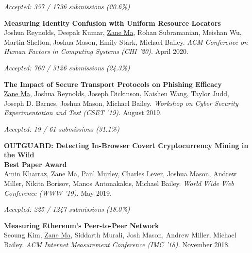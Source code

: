 \documentclass[10pt,singlecolumn]{article} %
\begin{document}
{\raggedleft\textit{Accepted: 357 / 1736 submissions (20.6\%)}\par}
\vspace{6pt}


\textbf{Measuring Identity Confusion with Uniform Resource Locators}\\
Joshua Reynolds, Deepak Kumar, \underline{Zane Ma}, Rohan Subramanian, Meishan Wu, Martin Shelton, Joshua Mason, Emily Stark, Michael Bailey.
\textit{ACM Conference on Human Factors in Computing Systems (CHI '20).} April 2020.

{\raggedleft\textit{Accepted: 760 / 3126 submissions (24.3\%)}\par}
\vspace{6pt}


\textbf{The Impact of Secure Transport Protocols on Phishing Efficacy}\\
\underline{Zane Ma}, Joshua Reynolds, Joseph Dickinson, Kaishen Wang, Taylor Judd, Joseph D. Barnes, Joshua Mason, Michael Bailey.
\textit{Workshop on Cyber Security Experimentation and Test (CSET '19).} August 2019.

{\raggedleft\textit{Accepted: 19 / 61 submissions (31.1\%)}\par}
\vspace{6pt}


\textbf{OUTGUARD: Detecting In-Browser Covert Cryptocurrency Mining in the Wild}\\
    \textbf{\color{headings}Best Paper Award}\\
Amin Kharraz, \underline{Zane Ma}, Paul Murley, Charles Lever, Joshua Mason, Andrew Miller,
Nikita Borisov, Manos Antonakakis, Michael Bailey. 
\textit{World Wide Web Conference (WWW '19).} May 2019.

{\raggedleft\textit{Accepted: 225 / 1247 submissions (18.0\%)}\par}
\vspace{6pt}


\textbf{Measuring Ethereum's Peer-to-Peer Network}\\
Seoung Kim, \underline{Zane Ma}, Siddarth Murali, Josh Mason, Andrew Miller, Michael Bailey.
\textit{ACM Internet Measurement Conference (IMC '18).} November 2018.
\end{document}
